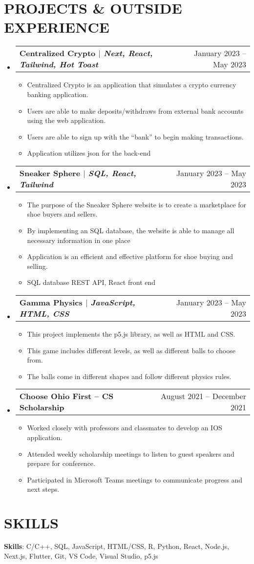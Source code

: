 \documentclass[letterpaper,11pt]{article}
\makeatletter
\newcommand{\projectItem}[1]{
  \item\small{#1}
}
\newcommand{\projectSubHeading}[2]{
  \vspace{-1pt}\item
    \begin{tabular*}{0.97\textwidth}[t]{l@{\extracolsep{\fill}}r}
      \textbf{#1} & #2 \\
    \end{tabular*}\vspace{-5pt}
}
\newcommand{\resumeItemListStart}{\begin{itemize}[leftmargin=*,label=\textbullet]}
\newcommand{\resumeItemListEnd}{\end{itemize}}
\makeatother
\begin{document}
\section{PROJECTS \& OUTSIDE EXPERIENCE}
  \begin{itemize}[leftmargin=0pt,label={}]
    \projectSubHeading
      {\textbf{Centralized Crypto} $|$ \emph{Next, React, Tailwind, Hot Toast}}{January 2023 -- May 2023}
      \resumeItemListStart
        \projectItem
          {Centralized Crypto is an application that simulates a crypto currency banking application.}
        \projectItem
          {Users are able to make deposits/withdraws from external bank accounts using the web application.}
        \projectItem
          {Users are able to sign up with the “bank” to begin making transactions.}
        \projectItem
          {Application utilizes json for the back-end}
      \resumeItemListEnd
    \projectSubHeading
      {\textbf{Sneaker Sphere} $|$ \emph{SQL, React, Tailwind}}{January 2023 -- May 2023}
      \resumeItemListStart
        \projectItem
          {The purpose of the Sneaker Sphere website is to create a marketplace for shoe buyers and sellers.}
        \projectItem
          {By implementing an SQL database, the website is able to manage all necessary information in one place}
        \projectItem
          {Application is an efficient and effective platform for shoe buying and selling.}
        \projectItem
          {SQL database REST API, React front end}
      \resumeItemListEnd
    \projectSubHeading
      {\textbf{Gamma Physics} $|$ \emph{JavaScript, HTML, CSS}}{January 2023 -- May 2023}
      \resumeItemListStart
        \projectItem
          {This project implements the p5.js library, as well as HTML and CSS.}
        \projectItem
          {This game includes different levels, as well as different balls to choose from.}
        \projectItem
          {The balls come in different shapes and follow different physics rules.}
      \resumeItemListEnd
    \projectSubHeading
      {\textbf{Choose Ohio First -- CS Scholarship}}{August 2021 -- December 2021}
      \resumeItemListStart
        \projectItem
          {Worked closely with professors and classmates to develop an IOS application.}
        \projectItem
          {Attended weekly scholarship meetings to listen to guest speakers and prepare for conference.}
        \projectItem
          {Participated in Microsoft Teams meetings to communicate progress and next steps.}
      \resumeItemListEnd
  \end{itemize}

\section{SKILLS}
    \small{\textbf{Skills}{: C/C++, SQL, JavaScript, HTML/CSS, R, Python, React, Node.js, Next.js, Flutter, Git, VS Code, Visual Studio, p5.js}}

\end{document}
